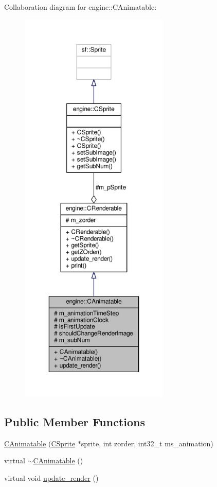 Collaboration diagram for engine\-:\-:C\-Animatable\-:
\nopagebreak
\begin{figure}[H]
\begin{center}
\leavevmode
\includegraphics[height=550pt]{classengine_1_1CAnimatable__coll__graph}
\end{center}
\end{figure}
\subsection*{Public Member Functions}
\begin{DoxyCompactItemize}
\item 
\hyperlink{classengine_1_1CAnimatable_a8f86ba331bc99901e2f551b0e6003870}{C\-Animatable} (\hyperlink{classengine_1_1CSprite}{C\-Sprite} $\ast$sprite, int zorder, int32\-\_\-t ms\-\_\-animation)
\item 
virtual \hyperlink{classengine_1_1CAnimatable_aa6adc28254bba68b2abcab5edb8b7f3e}{$\sim$\-C\-Animatable} ()
\item 
virtual void \hyperlink{classengine_1_1CAnimatable_a82b6fa8105fa03117e83a6131ab57a3c}{update\-\_\-render} ()
\end{DoxyCompactItemize}
